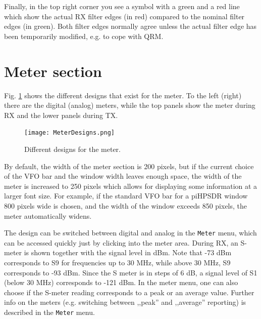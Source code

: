 \documentclass[12pt]{book}
\def\bltt#1{\texttt{\color{blue}#1}}
\def\pH{pi\-HPSDR\xspace}
\begin{document}
Finally, in the top right corner you see a symbol with a green and a red line
which show the actual RX filter edges (in red) compared to the nominal
filter edges (in green). Both filter edges normally agree unless the actual
filter edge has been temporarily modified, e.g. to cope with QRM.
\section{Meter section}
\label{sec:MeterSection}
Fig. \ref{fig:MeterDesigns} shows the different designs that exist for
the meter. To the left (right) there are the digital (analog) meters,
while the top panels show the meter during RX and the lower panels
during TX.

\begin{figure}[ht]
\center
\texttt{[image: MeterDesigns.png]}
\caption{Different designs for the meter.}
\label{fig:MeterDesigns}
\end{figure}

By default, the width of the meter section is 200 pixels, but if the current
choice of the VFO bar and the window width leaves enough space, the width
of the meter is increased to 250 pixels which allows for displaying some information
at a larger font size. For example, if the standard VFO bar for a \pH
window 800 pixels wide is chosen, and the width of the window exceeds 850
pixels, the meter automatically widens.

The design can be switched between digital and analog in the \bltt{Meter}
menu, which can be accessed quickly just by clicking into the meter area.
During RX, an S-meter is shown together with the signal level in dBm. Note
that -73 dBm corresponds to S9 for frequencies up to 30 MHz, while above
30 MHz, S9 corresponds to -93 dBm. Since the S meter is in steps of
6 dB, a signal level of S1 (below 30 MHz) corresponds to -121 dBm. In the
meter menu, one can also choose if the S-meter reading corresponds to a peak
or  an average value. Further info on the meters (e.g. switching between
,,peak'' and ,,average'' reporting)
is described in the \bltt{Meter} menu.
\end{document}
